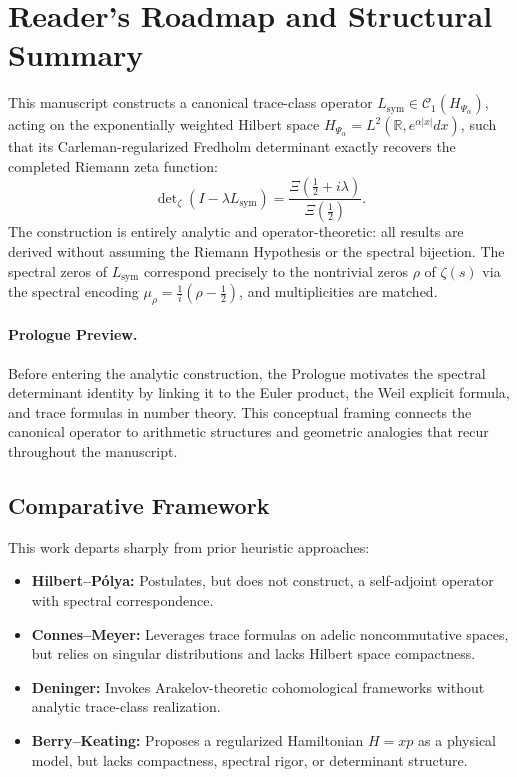 \section*{Reader’s Roadmap and Structural Summary}

This manuscript constructs a canonical trace-class operator \( L_{\mathrm{sym}} \in \mathcal{C}_1(H_{\Psi_\alpha}) \), acting on the exponentially weighted Hilbert space \( H_{\Psi_\alpha} = L^2(\mathbb{R}, e^{\alpha|x|} dx) \), such that its Carleman-regularized Fredholm determinant exactly recovers the completed Riemann zeta function:
\[
\det\nolimits_\zeta(I - \lambda L_{\mathrm{sym}}) = \frac{\Xi(\tfrac{1}{2} + i\lambda)}{\Xi(\tfrac{1}{2})}.
\]
The construction is entirely analytic and operator-theoretic: all results are derived without assuming the Riemann Hypothesis or the spectral bijection. The spectral zeros of \( L_{\mathrm{sym}} \) correspond precisely to the nontrivial zeros \( \rho \) of \( \zeta(s) \) via the spectral encoding \( \mu_\rho = \frac{1}{i}(\rho - \tfrac{1}{2}) \), and multiplicities are matched.

\paragraph{Prologue Preview.}
Before entering the analytic construction, the Prologue motivates the spectral determinant identity by linking it to the Euler product, the Weil explicit formula, and trace formulas in number theory. This conceptual framing connects the canonical operator to arithmetic structures and geometric analogies that recur throughout the manuscript.

\subsection*{Comparative Framework}

This work departs sharply from prior heuristic approaches:

\begin{itemize}
  \item \textbf{Hilbert--Pólya:} Postulates, but does not construct, a self-adjoint operator with spectral correspondence.
  \item \textbf{Connes--Meyer:} Leverages trace formulas on adelic noncommutative spaces, but relies on singular distributions and lacks Hilbert space compactness.
  \item \textbf{Deninger:} Invokes Arakelov-theoretic cohomological frameworks without analytic trace-class realization.
  \item \textbf{Berry--Keating:} Proposes a regularized Hamiltonian \( H = xp \) as a physical model, but lacks compactness, spectral rigor, or determinant structure.
\end{itemize}

